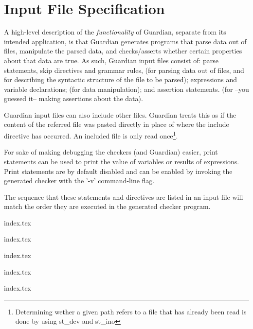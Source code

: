 
\chapter{Input File Specification}
{
	A high-level description of the \textit{functionality} of Guardian, separate
	from its intended application, is that Guardian generates programs that
	parse data out of files, manipulate the parsed data, and checks/asserts whether
	certain properties about that data are true. As such, Guardian input files
	consist of: parse statements, skip directives and grammar rules, (for
	parsing data out of files, and for describing the syntactic structure of
	the file to be parsed); expressions and variable declarations; (for data
	manipulation); and assertion statements. (for --you guessed it-- making
	assertions about the data).
	
	Guardian input files can also include other files. Guardian treats this as
	if the content of the referred file was pasted directly in place of where
	the include directive has occurred. An included file is only read
	once\footnote{Determining wether a given path refers to a file that has
	already been read is done by using st\_dev and st\_ino}.
	
	For sake of making debugging the checkers (and Guardian) easier, print
	statements can be used to print the value of variables or
	results of expressions. Print statements are by default disabled and can be
	enabled by invoking the generated checker with the '-v' command-line flag.
	
	The sequence that these statements and directives are listed in an input
	file will match the
	order they are executed in the generated checker program.
	
	{index.tex}
	
	{index.tex}
	
	{index.tex}
	
	{index.tex}
	
	{index.tex}
}










